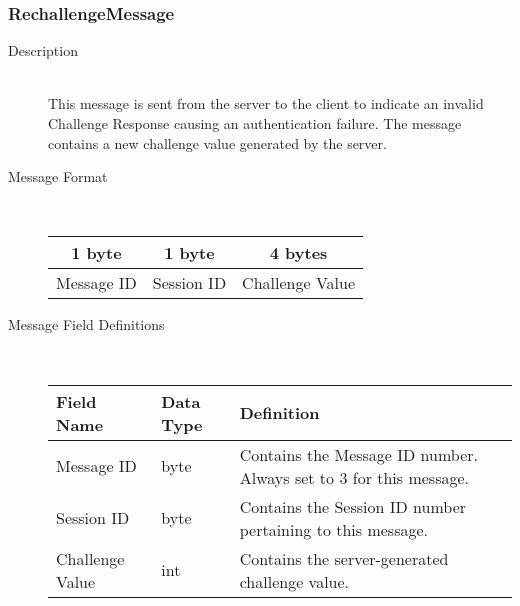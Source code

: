 \documentclass[12pt,letterpaper,titlepage]{article}
\begin{document}
\subsubsection{RechallengeMessage}
	\begin{description}
	\item[Description] \hfill \\
		This message is sent from the server to the client to indicate an invalid Challenge Response 
		causing an authentication failure.  The message contains a new challenge value generated by the server.
	\item[Message Format] \hfill \\
	\begin{tabular}{ | c | c | c | }
		\hline
		1 byte & 1 byte & 4 bytes \\
		\hline
		Message ID & Session ID &  Challenge Value \\
		\hline
	\end{tabular}
	\item[Message Field Definitions] \hfill \\
	\begin{tabular}{ | p{3cm} | p{1.5cm} | p{8cm} | }
		\hline
		Field Name & Data Type & Definition \\
		\hline
		Message ID & byte & Contains the Message ID number. 
					\newline Always set to 3 for this message. \\
		\hline
		Session ID & byte & Contains the Session ID number pertaining to this message. \\
		\hline
		Challenge Value & int & Contains the server-generated challenge value. \\
		\hline
	\end{tabular}
	\end{description}
\end{document}
